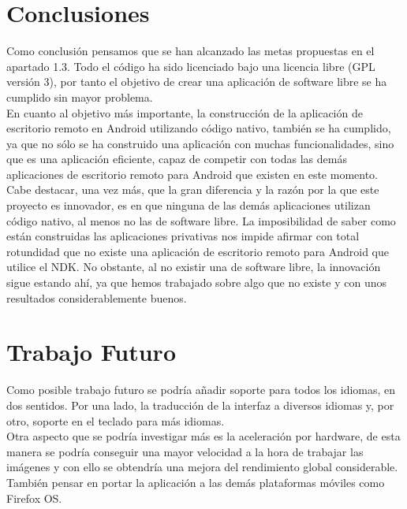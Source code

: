 \section{Conclusiones}
Como conclusión pensamos que se han alcanzado las metas propuestas en el apartado 1.3. Todo el código ha sido licenciado bajo una licencia libre (GPL versión 3), por tanto el objetivo de crear una aplicación de software libre se ha cumplido sin mayor problema.\\

En cuanto al objetivo más importante, la construcción de la aplicación de escritorio remoto en Android utilizando código nativo, también se ha cumplido, ya que no sólo se ha construido una aplicación con muchas funcionalidades, sino que es una aplicación eficiente, capaz de competir con todas las demás aplicaciones de escritorio remoto para Android que existen en este momento.\\

Cabe destacar, una vez más, que la gran diferencia y la razón por la que este proyecto es innovador, es en que ninguna de las demás aplicaciones utilizan código nativo, al menos no las de software libre. La imposibilidad de saber como están construidas las aplicaciones privativas nos impide afirmar con total rotundidad que no existe una aplicación de escritorio remoto para Android que utilice el NDK. No obstante, al no existir una de software libre, la innovación sigue estando ahí, ya que hemos trabajado sobre algo que no existe y con unos resultados considerablemente buenos.

\section{Trabajo Futuro}

Como posible trabajo futuro se podría añadir soporte para todos los idiomas, en dos sentidos. Por una lado, la traducción de la interfaz a diversos idiomas y, por otro, soporte en el teclado para más idiomas.\\

Otra aspecto que se podría investigar más es la aceleración por hardware, de esta manera se podría conseguir una mayor velocidad a la hora de trabajar las imágenes y con ello se obtendría una mejora del rendimiento global considerable.\\

También pensar en portar la aplicación a las demás plataformas móviles como Firefox OS. 
